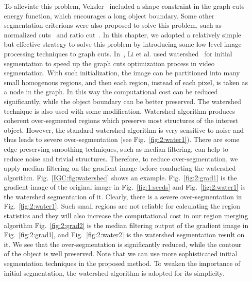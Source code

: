     To alleviate this problem, Veksler~\cite{shape3} included a shape constraint in the graph cuts
    energy function, which encourages a long object boundary. Some other segmentation criterions were also proposed to solve this problem, such as normalized cuts~\cite{Shi} and ratio cut~\cite{RatioCut}. In this chapter, we adopted a relatively simple but effective strategy to solve this problem by introducing some low level image processing techniques to graph cuts. In~\cite{lazy}, Li et al. used watershed~\cite{watershed} for initial segmentation to speed up the graph cuts optimization process in video segmentation. With such initialization, the image can be partitioned into many small homogenous regions, and then each region, instead of each pixel, is taken as a node in the graph. In this way the computational cost can be reduced significantly, while the object boundary can be better preserved. The watershed technique is also used with some modification.
    Watershed algorithm produces coherent over-segmented regions which preserve most structures
     of the interest object. However, the standard watershed algorithm is very sensitive to noise and thus leads to severe over-segmentation (see Fig.~\ref{fig:2:water1}). There are some
     edge-preserving smoothing techniques, such as median filtering, can help to reduce noise and trivial structures. Therefore, to reduce over-segmentation, we apply median filtering on the gradient image before conducting the watershed algorithm. Fig.~\ref{IGC:fig:watershed} shows an example. Fig.~\ref{fig:2:grad1} is the gradient image of the original image in  Fig.~\ref{fig:1:seeds} and Fig.~\ref{fig:2:water1} is the watershed segmentation of it. Clearly, there is a severe over-segmentation in Fig.~\ref{fig:2:water1}. Such small regions are not reliable for calculating the region statistics and they will also increase the computational cost in our region merging algorithm Fig.~\ref{fig:2:grad2} is the median filtering output of the gradient image in Fig.~\ref{fig:2:grad1}, and Fig.~\ref{fig:2:water2} is the watershed segmentation result on it. We see that the over-segmentation is significantly reduced, while the contour of the object is well preserved. Note that we can use more sophisticated initial segmentation techniques in the proposed method. To weaken the importance of initial segmentation, the watershed algorithm is adopted for its simplicity.

